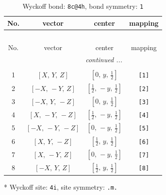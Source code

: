 \documentclass[fleqn,8pt]{jsarticle}
\begin{document}
\renewcommand{\arraystretch}{1.2}
\begin{longtable}{cccc}
\caption{Wyckoff bond: {\tt 8c@4h}, bond symmetry: {\tt 1}}
 \\
 \hline \hline
No. & vector & center & mapping \\ \hline \endfirsthead

\multicolumn{3}{l}{\tablename\ \thetable{}} \\
 \hline \hline
No. & vector & center & mapping \\ \hline \endhead

 \hline \hline
\multicolumn{3}{r}{\footnotesize\it continued ...} \\ \endfoot

 \hline \hline
\multicolumn{3}{r}{} \\ \endlastfoot

1 & $\left[ X,\, Y,\, Z \right]$ & $\left[ 0,\, y,\, \frac{1}{2} \right]$ & {\tt [1]} \\ \hline
2 & $\left[ - X,\, - Y,\, Z \right]$ & $\left[ \frac{1}{2},\, - y,\, \frac{1}{2} \right]$ & {\tt [2]} \\ \hline
3 & $\left[ - X,\, Y,\, - Z \right]$ & $\left[ 0,\, y,\, \frac{1}{2} \right]$ & {\tt [3]} \\ \hline
4 & $\left[ X,\, - Y,\, - Z \right]$ & $\left[ \frac{1}{2},\, - y,\, \frac{1}{2} \right]$ & {\tt [4]} \\ \hline
5 & $\left[ - X,\, - Y,\, - Z \right]$ & $\left[ 0,\, - y,\, \frac{1}{2} \right]$ & {\tt [5]} \\ \hline
6 & $\left[ X,\, Y,\, - Z \right]$ & $\left[ \frac{1}{2},\, y,\, \frac{1}{2} \right]$ & {\tt [6]} \\ \hline
7 & $\left[ X,\, - Y,\, Z \right]$ & $\left[ 0,\, - y,\, \frac{1}{2} \right]$ & {\tt [7]} \\ \hline
8 & $\left[ - X,\, Y,\, Z \right]$ & $\left[ \frac{1}{2},\, y,\, \frac{1}{2} \right]$ & {\tt [8]} \\
\end{longtable}
* Wyckoff site: {\tt 4i}, site symmetry: {\tt .m.}
\renewcommand{\arraystretch}{1.2}
\end{document}
